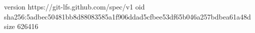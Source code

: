 version https://git-lfs.github.com/spec/v1
oid sha256:5adbec50481bb8d88083585a1f906ddad5cfbee53df65b046a257bdbea61a48d
size 626416
